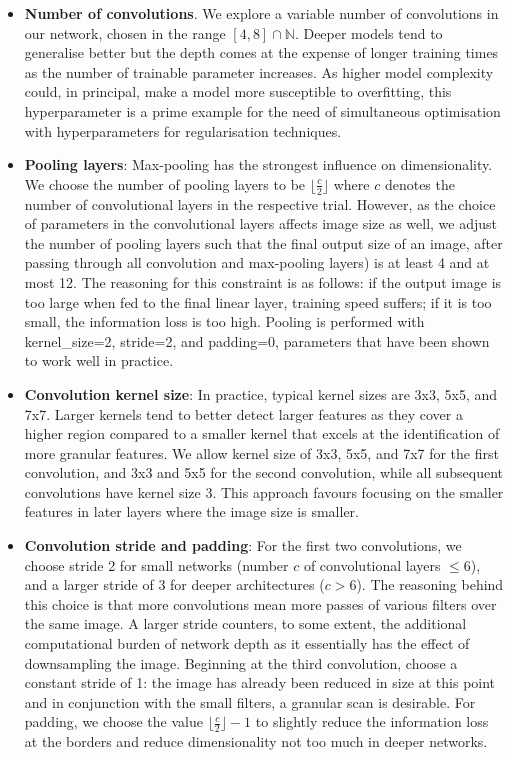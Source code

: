 \documentclass[british,12p]{article}
\begin{document}
    \begin{itemize}
    	\item \textbf{Number of convolutions}. We explore a variable number of convolutions in our network, chosen  in the range $[4, 8] \cap \mathbb{N}$. Deeper models tend to generalise better but the depth comes at the expense of longer training times as the number of trainable parameter increases. As higher model complexity could, in principal, make a model more susceptible to overfitting, this hyperparameter is a prime example for the need of simultaneous optimisation with hyperparameters for regularisation techniques.
    	\item \textbf{Pooling layers}: Max-pooling has the strongest influence on dimensionality. We choose the number of pooling layers to be $\lfloor \frac{c}{2}\rfloor$ where $c$ denotes the number of convolutional layers in the respective trial. However, as the choice of parameters in the convolutional layers affects image size as well, we adjust the number of pooling layers such that the final output size of an image, after passing through all convolution and max-pooling layers) is at least 4 and at most 12. The reasoning for this constraint is as follows: if the output image is too large when fed to the final linear layer, training speed suffers; if it is too small, the information loss is too high. Pooling is performed with kernel\_size=2, stride=2, and padding=0, parameters that have been shown to work well in practice.
    	\item \textbf{Convolution kernel size}: In practice, typical kernel sizes are 3x3, 5x5, and 7x7. Larger kernels tend to better detect larger features as they cover a higher region compared to a smaller kernel that excels at the identification of more granular features. We allow kernel size of 3x3, 5x5, and 7x7 for the first convolution, and 3x3 and 5x5 for the second convolution, while all subsequent convolutions have kernel size 3. This approach favours focusing on the smaller features in later layers where the image size is smaller.  
    	\item \textbf{Convolution stride and padding}: For the first two convolutions, we choose stride 2 for small networks (number $c$ of convolutional layers $\le 6$), and a larger stride of 3 for deeper architectures ($c > 6$). The reasoning behind this choice is that more convolutions mean more passes of various filters over the same image. A larger stride counters, to some extent, the additional computational burden of network depth as it essentially has the effect of downsampling the image. Beginning at the third convolution, choose a constant stride of 1: the image has already been reduced in size at this point and in conjunction with the small filters, a granular scan is desirable. For padding, we choose the value $\lfloor \frac{c}{2}\rfloor - 1$ to slightly reduce the information loss at the borders and reduce dimensionality not too much in deeper networks. 

\end{itemize}
\end{document}
